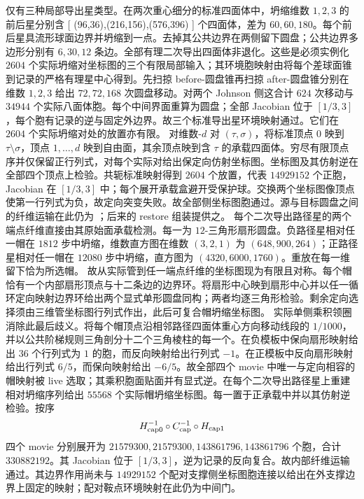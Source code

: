 仅有三种局部导出星类型。在两次重心细分的标准四面体中，坍缩维数 $1,2,3$ 的前后星分别含
[
(96,36),\qquad(216,156),\qquad(576,396)
]
个四面体，差为 $60,60,180$。每个前后星具流形球面边界并坍缩到一点。去掉其公共边界在两侧留下圆盘；公共边界多边形分别有 $6,30,12$ 条边。全部有理二次导出四面体非退化。这些是必须实例化 $2604$ 个实际坍缩对坐标图的三个有限局部输入；其环境胞映射由将每个差球面锥到记录的严格有理星中心得到。先扫掠 before-圆盘锥再扫掠 after-圆盘锥分别在维数 $1,2,3$ 给出 $72,72,168$ 次圆盘移动。对两个 Johnson 侧这合计 $624$ 次移动与 $34944$ 个实际八面体胞。每个中间界面重算为圆盘；全部 Jacobian 位于 $[1/3,3]$，每个胞有记录的逆与固定外边界。故三个标准导出星环境映射通过。它们在 $2604$ 个实际坍缩对处的放置亦有限。
对维数-$d$ 对 $(\tau,\sigma)$，将标准顶点 $0$ 映到
$\tau\setminus\sigma$，顶点 $1,\ldots,d$ 映到自由面，其余顶点映到含 $\tau$ 的承载四面体。穷尽有限顶点序并仅保留正行列式，对每个实际对给出保定向仿射坐标图。坐标图及其仿射逆在全部四个顶点上检验。共轭标准映射得到 $2604$ 个放置，代表 $14929152$ 个正胞，Jacobian 在 $[1/3,3]$ 中；每个展开承载盒避开受保护球。交换两个坐标图像顶点使第一行列式为负，故定向突变失败。故全部侧坐标图胞通过。源与目标圆盘之间的纤维运输在此仍为 \Open；后来的 restore 组装提供之。
每个二次导出路径星的两个端点纤维直接由其原始面承载检测。每一为 $12$-三角形扇形圆盘。负路径星相对任一帽在 $1812$ 步中坍缩，维数直方图在维数 $(3,2,1)$ 为 $(648,900,264)$；正路径星相对任一帽在 $12080$ 步中坍缩，直方图为
$(4320,6000,1760)$。重放在每一维留下恰为所选帽。
故从实际管到任一端点纤维的坐标图现为有限且对称。每个帽恰有一个内部扇形顶点与十二条边的边界环。将扇形中心映到扇形中心并以任一循环定向映射边界环给出两个显式单形圆盘同构；两者均逐三角形检验。剩余定向选择须由三维管坐标图行列式作出，此后可复合帽坍缩坐标图。
实际单侧乘积领圈消除此最后歧义。将每个帽顶点沿相邻路径四面体重心方向移动线段的 $1/1000$，并以公共阶梯规则三角剖分十二个三角棱柱的每一个。在负模板中保向扇形映射给出 $36$ 个行列式为 $1$ 的胞，而反向映射给出行列式 $-1$。在正模板中反向扇形映射给出行列式 $6/5$，而保向映射给出 $-6/5$。故全部四个 movie 中唯一与定向相容的帽映射被 live 选取；其乘积胞面贴面并有显式逆。在每个二次导出路径星上重建相对坍缩序列给出 $55568$ 个实际帽坍缩坐标图。每一置于正承载中并以其仿射逆检验。按序
\begin{equation*}
H_{\rm cap0}^{-1}\circ C_{\rm cap}^{-1}\circ H_{\rm cap1}
\end{equation*}
四个 movie 分别展开为 $21579300,21579300,143861796,143861796$ 个胞，合计 $330882192$。其 Jacobian 位于 $[1/3,3]$，逆为记录的反向复合。故内部纤维运输通过。其边界作用尚未与 $14929152$ 个配对支撑侧坐标图胞连接以给出在外支撑边界上固定的映射；配对鞍点环境映射在此仍为中间门。
